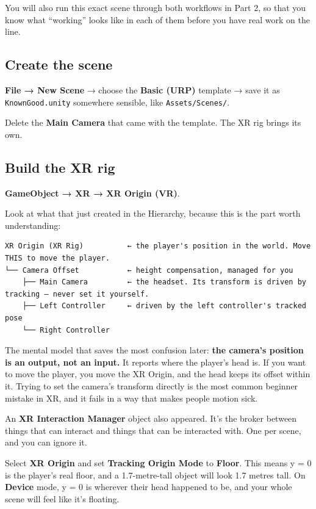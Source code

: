 \documentclass[11pt,a4paper]{article}
\begin{document}
You will also run this exact scene through both workflows in Part 2, so that you know what
``working'' looks like in each of them before you have real work on the line.

\subsection{Create the scene}\label{create-the-scene}

\textbf{File → New Scene} → choose the \textbf{Basic (URP)} template → save it as
\texttt{KnownGood.unity} somewhere sensible, like \texttt{Assets/Scenes/}.

Delete the \textbf{Main Camera} that came with the template. The XR rig brings its own.

\subsection{Build the XR rig}\label{build-the-xr-rig}

\textbf{GameObject → XR → XR Origin (VR)}.

Look at what that just created in the Hierarchy, because this is the part worth
understanding:

\begin{verbatim}
XR Origin (XR Rig)          ← the player's position in the world. Move THIS to move the player.
└── Camera Offset           ← height compensation, managed for you
    ├── Main Camera         ← the headset. Its transform is driven by tracking — never set it yourself.
    ├── Left Controller     ← driven by the left controller's tracked pose
    └── Right Controller
\end{verbatim}

The mental model that saves the most confusion later: \textbf{the camera's position is an
output, not an input.} It reports where the player's head is. If you want to move the
player, you move the XR Origin, and the head keeps its offset within it. Trying to set the
camera's transform directly is the most common beginner mistake in XR, and it fails in a
way that makes people motion sick.

An \textbf{XR Interaction Manager} object also appeared. It's the broker between things that
can interact and things that can be interacted with. One per scene, and you can ignore it.

Select \textbf{XR Origin} and set \textbf{Tracking Origin Mode} to \textbf{Floor}. This means y = 0 is
the player's real floor, and a 1.7-metre-tall object will look 1.7 metres tall. On
\textbf{Device} mode, y = 0 is wherever their head happened to be, and your whole scene will
feel like it's floating.
\end{document}
